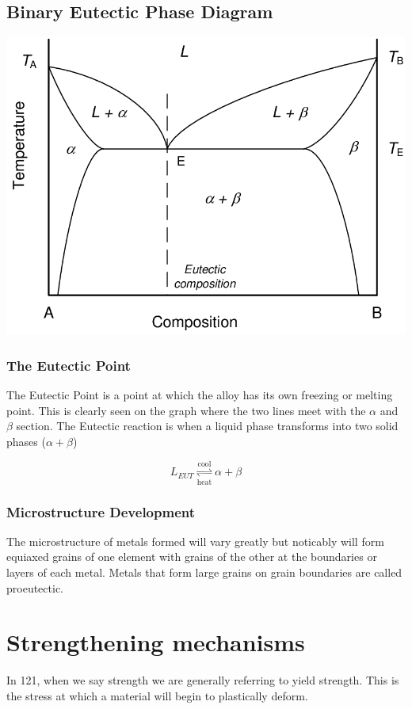 \documentclass[12pt]{article}
\begin{document}
\subsection{Binary Eutectic Phase Diagram}
\begin{center}
  \includegraphics[scale=0.5]{binaryeutectic}
\end{center}

\subsubsection{The Eutectic Point}
The Eutectic Point is a point at which the alloy has its own freezing or melting point.
This is clearly seen on the graph where the two lines meet with the $\alpha$ and $\beta$ section.
The Eutectic reaction is when a liquid phase transforms into two solid phases ($\alpha+\beta$)

\begin{equation*}
  L_{EUT} \underset{\text{heat}}{\stackrel{\text{cool}}{\rightleftharpoons}} \alpha + \beta 
\end{equation*}

\subsubsection{Microstructure Development}
The microstructure of metals formed will vary greatly but noticably will form equiaxed grains of one element with grains of the other at the boundaries or layers of each metal.
Metals that form large grains on grain boundaries are called proeutectic.

\section{Strengthening mechanisms}
In 121, when we say strength we are generally referring to yield strength.
This is the stress at which a material will begin to plastically deform.  
\end{document}
